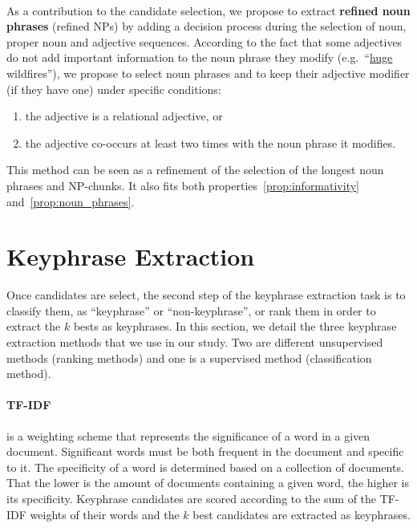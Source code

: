   \paragraph{}
  As a contribution to the candidate selection, we propose to extract
  \textbf{refined noun phrases} (refined NPs) by adding a decision process
  during the selection of noun, proper noun and adjective sequences. According
  to the fact that some adjectives do not add important information to the noun
  phrase they modify (e.g.~``\underline{huge} wildfires''), we propose to
  select noun phrases and to keep their adjective modifier (if they have one)
  under specific conditions:
  \begin{enumerate}
    \item{the adjective is a relational adjective, or}
    \item{the adjective co-occurs at least two times with the noun phrase it
          modifies.}
  \end{enumerate}
  This method can be seen as a refinement of the selection of the longest noun
  phrases and NP-chunks. It also fits both properties~\ref{prop:informativity}
  and~\ref{prop:noun_phrases}.

\section{Keyphrase Extraction}
\label{sec:keyphrase_extraction}
  Once candidates are select, the second step of the keyphrase extraction task
  is to classify them, as ``keyphrase'' or ``non-keyphrase'', or rank them in
  order to extract the $k$ bests as keyphrases. In this section, we detail the
  three keyphrase extraction methods that we use in our study. Two are different
  unsupervised methods (ranking methods) and one is a supervised method
  (classification method).

  \paragraph{TF-IDF~\textnormal{\cite{jones1972tfidf}}} is a weighting scheme
  that represents the significance of a word in a given document. Significant
  words must be both frequent in the document and specific to it. The
  specificity of a word is determined based on a collection of documents. That
  the lower is the amount of documents containing a given word, the higher is
  its specificity. Keyphrase candidates are scored according to the sum of the
  TF-IDF weights of their words and the $k$ best candidates are extracted as
  keyphrases.

